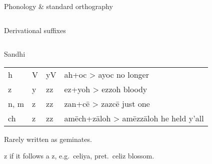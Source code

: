 \documentclass[12pt]{beamer}
\newcommand{\nah}[1]{\textcolor{nahgrn}{#1}}
\newcommand{\trs}[1]{\textcolor{nahblu}{#1}}
\begin{document}
\begin{frame}
\begin{columns}[t]
\begin{column}{.22\linewidth}
\begin{block}{Phonology \& standard orthography}
\begin{threeparttable}
\begin{tablenotes}
\begin{frame}
\begin{columns}[t]
\begin{column}{.22\linewidth}
\begin{block}{Derivational suffixes}
\begin{threeparttable}
\begin{multicols}{2}
\begin{itemize}
\begin{column}{.26\linewidth}
\begin{block}{Sandhi}
\begin{threeparttable}
\begin{tabular}{l@{+ }l@{> }ll}
            \nah{h}    & \nah{V}   & \nah{yV}              & \nah{ah}+\nah{oc} > \nah{ayoc} \trs{no longer}                  \\
            \nah{z}    & \nah{y}   & \nah{zz}\tnote{1}     & \nah{ez}+\nah{yoh} > \nah{ezzoh} \trs{bloody}                   \\
            \nah{n, m} & \nah{z}   & \nah{zz}\tnote{1}     & \nah{zan}+\nah{cē} > \nah{zazcē} \trs{just one}                 \\
            \nah{ch}   & \nah{z}   & \nah{zz}\tnote{1}     & \nah{amēch}+\nah{zāloh} > \nah{amēzzāloh} \trs{he held y'all}   \\
          \end{tabular}%
          \begin{tablenotes}
            \item[1] Rarely written as geminates.
            \item[2] \nah{z} if it follows a \nah{z}, e.g.~\nah{celiya}, pret.~\nah{celiz} \trs{blossom}.

          \end{tablenotes}
        \end{threeparttable}
      \end{block}


\end{column}
\end{itemize}
\end{multicols}
\end{threeparttable}
\end{block}
\end{column}
\end{columns}
\end{frame}
\end{tablenotes}
\end{threeparttable}
\end{block}
\end{column}
\end{columns}
\end{frame}
\end{document}
